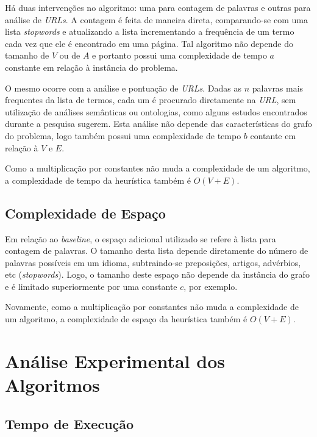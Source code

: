\documentclass[a4paper,12pt,titlepage]{article}
\begin{document}
Há duas intervenções no algoritmo: uma para contagem de palavras e outras para análise de \textit{URLs}. A contagem é feita de maneira direta, comparando-se com uma lista \textit{stopwords} e atualizando a lista incrementando a frequência de um termo cada vez que ele é encontrado em uma página. Tal algoritmo não depende do tamanho de $V$ ou de $A$ e portanto possui uma complexidade de tempo $a$ constante em relação à instância do problema. 

O mesmo ocorre com a análise e pontuação de \textit{URLs}. Dadas as $n$ palavras mais frequentes da lista de termos, cada um é procurado diretamente na \textit{URL}, sem utilização de análises semânticas ou ontologias, como alguns estudos encontrados durante a pesquisa sugerem. Esta análise não depende das características do grafo do problema, logo também possui uma complexidade de tempo $b$ contante em relação à $V$ e $E$.

Como a multiplicação por constantes não muda a complexidade de um algoritmo, a complexidade de tempo da heurística também é $O(V+E)$.

\subsection{Complexidade de Espaço}

Em relação ao \textit{baseline}, o espaço adicional utilizado se refere à lista para contagem de palavras. O tamanho desta lista depende diretamente do número de palavras possíveis em um idioma, subtraindo-se preposições, artigos, advérbios, etc (\textit{stopwords}). Logo, o tamanho deste espaço não depende da instância do grafo e é limitado superiormente por uma constante $c$, por exemplo.

Novamente, como a multiplicação por constantes não muda a complexidade de um algoritmo, a complexidade de espaço da heurística também é $O(V+E)$.

\section{Análise Experimental dos Algoritmos}

\subsection{Tempo de Execução}
\end{document}
